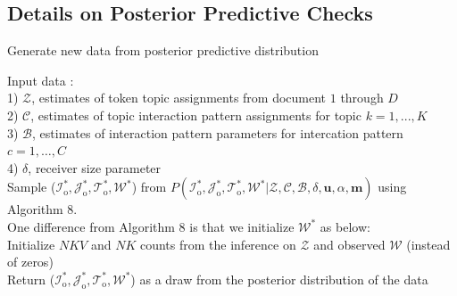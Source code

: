 \documentclass[a4paper]{article}
\begin{document}
             \subsection{Details on Posterior Predictive Checks}\label{subsec:Details on PPC}    
          \begin{algorithm}[H]
          	\SetAlgoLined
          	\caption{Generate new data from posterior predictive distribution}
          	Input data :\\
          	1) $\mathcal{Z}$, estimates of token topic assignments from document $1$ through $D$\\
          	2) $\mathcal{C}$, estimates of topic interaction pattern assignments for topic $k = 1,...,K$\\
          	3) $\mathcal{B}$,  estimates of interaction pattern parameters for intercation pattern $c = 1,\hdots,C$\\
          	4) $\delta$, receiver size parameter \\
          	Sample ($\mathcal{I}_{\mbox{o}}^*, \mathcal{J}_{\mbox{o}}^*, \mathcal{T}_{\mbox{o}}^*,\mathcal{W}^*$) from $P(\mathcal{I}_{\mbox{o}}^*, \mathcal{J}_{\mbox{o}}^*, \mathcal{T}_{\mbox{o}}^*,\mathcal{W}^* |\mathcal{Z}, \mathcal{C}, \mathcal{B}, \delta,\boldsymbol{u}, \alpha, \boldsymbol{m})$ using Algorithm 8.\\
          	One difference from Algorithm 8 is that we initialize $\mathcal{W}^*$ as below:\\
          	Initialize $NKV$ and $NK$ counts from the inference on $\mathcal{Z}$ and observed $\mathcal{W}$ (instead of zeros)\\
          	Return ($\mathcal{I}_{\mbox{o}}^*, \mathcal{J}_{\mbox{o}}^*, \mathcal{T}_{\mbox{o}}^*,\mathcal{W}^*$) as a draw from the posterior distribution of the data
          \end{algorithm}        
          
             
\end{document}
